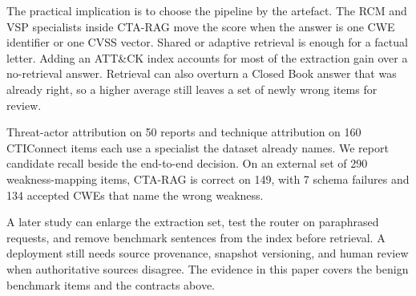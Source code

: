 \documentclass[5p,times,authoryear]{elsarticle}
\begin{document}
The practical implication is to choose the pipeline by the artefact. The RCM and VSP specialists inside CTA-RAG move the score when the answer is one CWE identifier or one CVSS vector. Shared or adaptive retrieval is enough for a factual letter. Adding an ATT\&CK index accounts for most of the extraction gain over a no-retrieval answer. Retrieval can also overturn a Closed Book answer that was already right, so a higher average still leaves a set of newly wrong items for review.

Threat-actor attribution on 50 reports and technique attribution on 160 CTIConnect items each use a specialist the dataset already names. We report candidate recall beside the end-to-end decision. On an external set of 290 weakness-mapping items, CTA-RAG is correct on 149, with 7 schema failures and 134 accepted CWEs that name the wrong weakness.

A later study can enlarge the extraction set, test the router on paraphrased requests, and remove benchmark sentences from the index before retrieval. A deployment still needs source provenance, snapshot versioning, and human review when authoritative sources disagree. The evidence in this paper covers the benign benchmark items and the contracts above.




\end{document}
